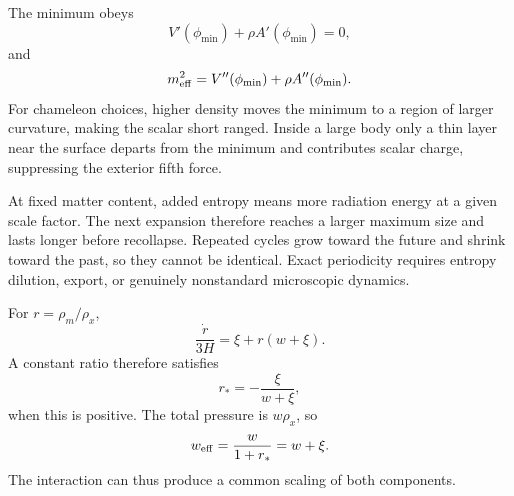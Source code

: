 \begin{solution}
The minimum obeys
\[
V'(\phi_{\min})+\rho A'(\phi_{\min})=0,
\]
and
\[
m_{\rm eff}^2=V''(\phi_{\min})+\rho A''(\phi_{\min}).
\]
For chameleon choices, higher density moves the minimum to a region of larger
curvature, making the scalar short ranged.  Inside a large body only a thin
layer near the surface departs from the minimum and contributes scalar charge,
suppressing the exterior fifth force.
\end{solution}

\begin{solution}
At fixed matter content, added entropy means more radiation energy at a given
scale factor.  The next expansion therefore reaches a larger maximum size and
lasts longer before recollapse.  Repeated cycles grow toward the future and
shrink toward the past, so they cannot be identical.  Exact periodicity
requires entropy dilution, export, or genuinely nonstandard microscopic
dynamics.
\end{solution}

\begin{solution}
For \(r=\rho_m/\rho_x\),
\[
\frac{\dot r}{3H}
=\xi+r(w+\xi).
\]
A constant ratio therefore satisfies
\[
r_\ast=-\frac{\xi}{w+\xi},
\]
when this is positive.  The total pressure is \(w\rho_x\), so
\[
w_{\rm eff}=\frac{w}{1+r_\ast}=w+\xi.
\]
The interaction can thus produce a common scaling of both components.
\end{solution}
